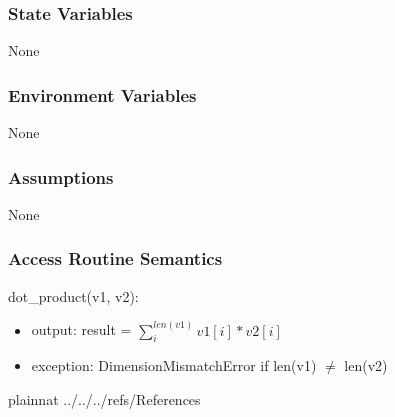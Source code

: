 \documentclass[12pt, titlepage]{article}
\begin{document}
\subsubsection{State Variables}
None

\subsubsection{Environment Variables}

None

\subsubsection{Assumptions}

None

\subsubsection{Access Routine Semantics}

\noindent dot\_product(v1, v2):
\begin{itemize}
\item output: result = $\sum_i^{len(v1)} v1[i] * v2[i]$
\item exception: DimensionMismatchError if len(v1) $\neq$ len(v2)
\end{itemize}


\newpage

 {plainnat}
 {../../../refs/References}

\newpage

\newpage{}
\end{document}
